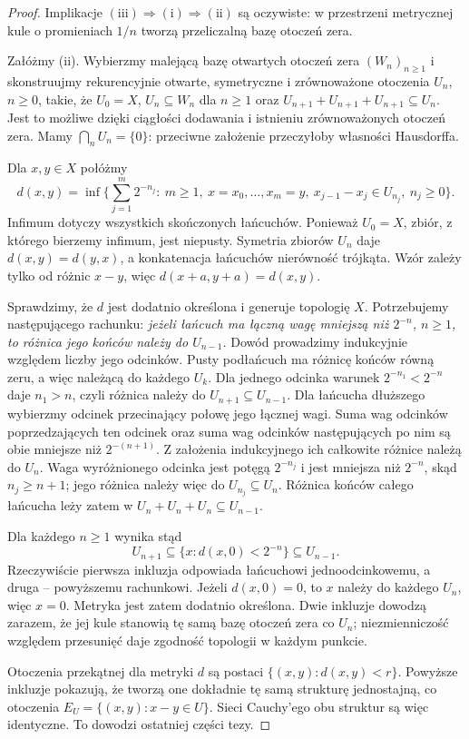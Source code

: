 \begin{proof}
Implikacje $(\mathrm{iii})\Rightarrow(\mathrm{i})\Rightarrow(\mathrm{ii})$ są oczywiste:
w przestrzeni metrycznej kule o promieniach $1/n$
tworzą przeliczalną bazę otoczeń zera.

Załóżmy (ii). Wybierzmy malejącą bazę otwartych otoczeń
zera $(W_n)_{n\ge1}$ i skonstruujmy rekurencyjnie
otwarte, symetryczne i zrównoważone otoczenia $U_n$,
$n\ge0$, takie, że
$U_0=X$, $U_n\subseteq W_n$ dla $n\ge1$ oraz
$U_{n+1}+U_{n+1}+U_{n+1}\subseteq U_n$.
Jest to możliwe dzięki ciągłości dodawania i istnieniu
zrównoważonych otoczeń zera. Mamy $\bigcap_nU_n=\{0\}$:
przeciwne założenie przeczyłoby własności Hausdorffa.

Dla $x,y\in X$ połóżmy
\[
 d(x,y)=\inf\Big\{\sum_{j=1}^{m}2^{-n_j}:\
 m\ge1,\ x=x_0,\ldots,x_m=y,\
 x_{j-1}-x_j\in U_{n_j},\ n_j\ge0\Big\}.
\]
Infimum dotyczy wszystkich skończonych łańcuchów.
Ponieważ $U_0=X$, zbiór, z którego bierzemy infimum,
jest niepusty. Symetria zbiorów $U_n$ daje
$d(x,y)=d(y,x)$, a konkatenacja łańcuchów nierówność
trójkąta. Wzór zależy tylko od różnic $x-y$, więc
$d(x+a,y+a)=d(x,y)$.

Sprawdzimy, że $d$ jest dodatnio określona i generuje
topologię $X$. Potrzebujemy następującego rachunku:
\emph{jeżeli łańcuch ma łączną wagę mniejszą niż $2^{-n}$,
$n\ge1$, to różnica jego końców należy do $U_{n-1}$.}
Dowód prowadzimy indukcyjnie względem liczby jego
odcinków. Pusty podłańcuch ma różnicę końców równą zeru,
a więc należącą do każdego $U_k$.
Dla jednego odcinka warunek
$2^{-n_1}<2^{-n}$ daje $n_1>n$, czyli różnica należy do
$U_{n+1}\subseteq U_{n-1}$. Dla łańcucha dłuższego
wybierzmy odcinek przecinający połowę jego łącznej
wagi. Suma wag odcinków poprzedzających ten odcinek
oraz suma wag odcinków następujących po nim są
obie mniejsze niż $2^{-(n+1)}$. Z założenia
indukcyjnego ich całkowite różnice należą do $U_n$.
Waga wyróżnionego odcinka jest potęgą $2^{-n_j}$
i jest mniejsza niż $2^{-n}$, skąd $n_j\geq n+1$;
jego różnica należy więc do $U_{n_j}\subseteq U_n$.
Różnica końców całego łańcucha leży zatem w
$U_n+U_n+U_n\subseteq U_{n-1}$.

Dla każdego $n\ge1$ wynika stąd
\[
 U_{n+1}\subseteq\{x:d(x,0)<2^{-n}\}\subseteq U_{n-1}.
\]
Rzeczywiście pierwsza inkluzja odpowiada łańcuchowi
jednoodcinkowemu, a druga -- powyższemu rachunkowi.
Jeżeli $d(x,0)=0$, to $x$ należy do każdego $U_n$,
więc $x=0$. Metryka jest zatem dodatnio określona.
Dwie inkluzje dowodzą zarazem, że jej kule stanowią
tę samą bazę otoczeń zera co $U_n$; niezmienniczość
względem przesunięć daje zgodność topologii w każdym punkcie.

Otoczenia przekątnej dla metryki $d$ są postaci
$\{(x,y):d(x,y)<r\}$. Powyższe inkluzje pokazują,
że tworzą one dokładnie tę samą strukturę jednostajną,
co otoczenia $E_U=\{(x,y):x-y\in U\}$.
Sieci Cauchy'ego obu struktur są więc identyczne.
To dowodzi ostatniej części tezy.
\end{proof}

